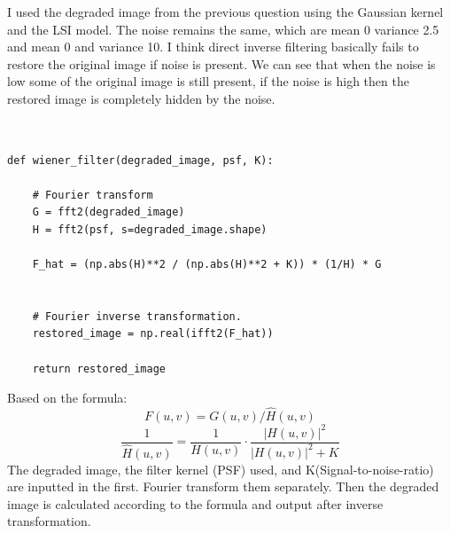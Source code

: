 \documentclass[12pt]{article}
\begin{document}
I used the degraded image from the previous question using the Gaussian kernel and the LSI model. The noise remains the same, which are mean 0 variance 2.5 and mean 0 and variance 10.
I think direct inverse filtering basically fails to restore the original image if noise is present. We can see that when the noise is low some of the original image is still present, if the noise is high then the restored image is completely hidden by the noise.


\subsection{}
\begin{lstlisting}
    
def wiener_filter(degraded_image, psf, K):

    # Fourier transform
    G = fft2(degraded_image)
    H = fft2(psf, s=degraded_image.shape)

    F_hat = (np.abs(H)**2 / (np.abs(H)**2 + K)) * (1/H) * G
   

    # Fourier inverse transformation.
    restored_image = np.real(ifft2(F_hat))

    return restored_image   

\end{lstlisting}
Based on the formula:
\[F(u,v) = G(u,v)/\hat{H}(u,v)\]
\[
\frac{1}{\hat{H}(u,v)}
= \frac{1}{H(u,v)} \cdot \frac{\lvert H(u,v)\rvert^2}{\lvert H(u,v)\rvert^2 + K}
\]
The degraded image, the filter kernel (PSF) used, and K(Signal-to-noise-ratio) are inputted in the first. Fourier transform them separately. Then the degraded image is calculated according to the formula and output after inverse transformation.
\end{document}
